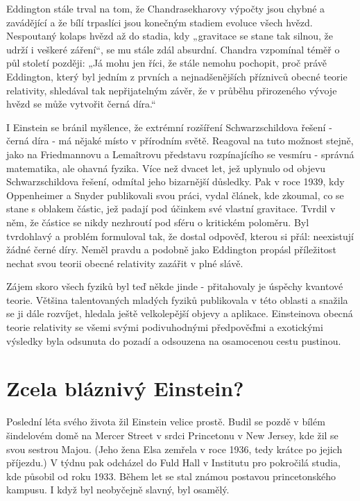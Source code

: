   Eddington stále trval na tom, že Chandrasekharovy výpočty jsou chybné a zavádějící a že bílí
  trpaslíci jsou konečným stadiem evoluce všech hvězd. Nespoutaný kolaps hvězd až do stadia, kdy
  „gravitace se stane tak silnou, že udrží i veškeré záření“, se mu stále zdál absurdní. Chandra
  vzpomínal téměř o půl století později: „Já mohu jen říci, že stále nemohu pochopit, proč právě
  Eddington, který byl jedním z prvních a nejnadšenějších příznivců obecné teorie relativity,
  shledával tak nepřijatelným závěr, že v průběhu přirozeného vývoje hvězd se může vytvořit černá
  díra.“
  
  I Einstein se bránil myšlence, že extrémní rozšíření Schwarzschildova řešení - černá díra - má
  nějaké místo v přírodním světě. Reagoval na tuto možnost stejně, jako na Friedmannovu a Lemaîtrovu
  představu rozpínajícího se vesmíru - správná matematika, ale ohavná fyzika. Více než dvacet let,
  jež uplynulo od objevu Schwarzschildova řešení, odmítal jeho bizarnější důsledky. Pak v roce 1939,
  kdy Oppenheimer a Snyder publikovali svou práci, vydal článek, kde zkoumal, co se stane s oblakem
  částic, jež padají pod účinkem své vlastní gravitace. Tvrdil v něm, že částice se nikdy nezhroutí
  pod sféru o kritickém poloměru. Byl tvrdohlavý a problém formuloval tak, že dostal odpověď, kterou
  si přál: neexistují žádné černé díry. Neměl pravdu a podobně jako Eddington propásl příležitost
  nechat svou teorii obecné relativity zazářit v plné slávě. 
  
  Zájem skoro všech fyziků byl teď někde jinde - přitahovaly je úspěchy kvantové teorie. Většina
  talentovaných mladých fyziků publikovala v této oblasti a snažila se ji dále rozvíjet, hledala
  ještě velkolepější objevy a aplikace. Einsteinova obecná teorie relativity se všemi svými
  podivuhodnými předpověďmi a exotickými výsledky byla odsunuta do pozadí a odsouzena na osamocenou
  cestu pustinou.

\section{Zcela bláznivý Einstein?}\label{kulIchIIIsecVI}
  Poslední léta svého života žil Einstein velice prostě. Budil se pozdě v bílém šindelovém domě na
  Mercer Street v srdci Princetonu v New Jersey, kde žil se svou sestrou Majou. (Jeho žena Elsa
  zemřela v roce 1936, tedy krátce po jejich příjezdu.) V týdnu pak odcházel do Fuld Hall v
  Institutu pro pokročilá studia, kde působil od roku 1933. Během let se stal známou postavou
  princetonského kampusu. I když byl neobyčejně slavný, byl osamělý. 
  
